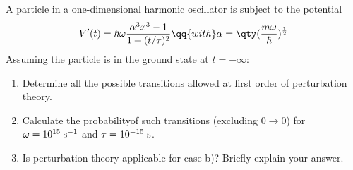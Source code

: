 \begin{esercizio}
   A particle in a one-dimensional harmonic oscillator is subject to the potential
   \begin{equation*}
      V'(t)=\hbar\omega \frac{\alpha^3 x^3 - 1}{1 + (t/\tau)^2}
      \qq{with}
      \alpha=\qty(\frac{m \omega}{\hbar})^{\frac{1}{2}}
   \end{equation*}
   Assuming the particle is in the ground state at $t=-\infty$:
   \begin{enumerate}[label=\alph*), leftmargin=0.6cm]
      \item Determine all the possible transitions allowed at first order of perturbation theory.
      \item Calculate the probability\footnotemark\;of such transitions (excluding $0 \to 0$) for $\omega=10^{15} \rm \; s^{-1}$ and $\tau=10^{-15} \rm \; s$.
      \item Is perturbation theory applicable for case b)? Briefly explain your answer.
   \end{enumerate}
\end{esercizio}
